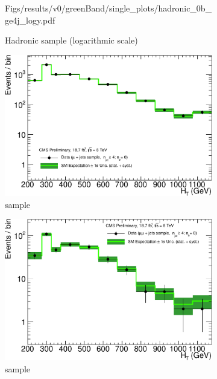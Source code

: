 \begin{figure}[h!]
\begin{subfigure}[b]{0.48\textwidth}
    {Figs/results/v0/greenBand/single_plots/hadronic_0b_ge4j_logy.pdf}
    \caption{Hadronic sample (logarithmic scale)}
  \end{subfigure}
  \begin{subfigure}[b]{0.48\textwidth}
    \includegraphics[width=\textwidth]
    {Figs/results/v0/greenBand/single_plots/muon_0b_ge4j_logy.pdf}
    \caption{\mj sample}
  \end{subfigure}
  \begin{subfigure}[b]{0.48\textwidth}
    \includegraphics[width=\textwidth]
    {Figs/results/v0/greenBand/single_plots/mumu_0b_ge4j_logy.pdf}
    \caption{\mmj sample}
  \end{subfigure}\\
  \begin{subfigure}[b]{0.48\textwidth}

\end{subfigure}
\end{figure}
